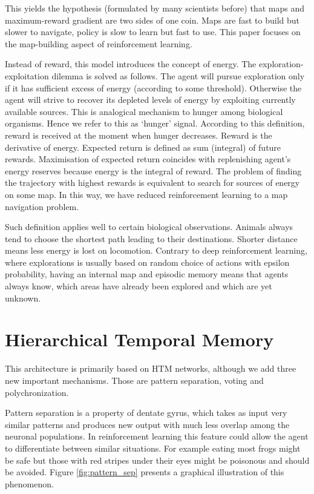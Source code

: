\documentclass[12pt]{article}
\begin{document}
This yields the hypothesis (formulated by many scientists before) that maps and maximum-reward gradient are two sides of one coin. Maps are fast to build but slower to navigate, policy is slow to learn but fast to use. This paper focuses on the map-building aspect of reinforcement learning. 

Instead of reward, this model introduces the concept of energy. 
The exploration-exploitation dilemma is solved as follows. The agent will
pursue exploration only if it has sufficient excess of energy (according to some threshold). Otherwise the agent will strive to recover its depleted levels of energy by exploiting currently available sources. This is analogical mechanism to hunger among biological organisms. Hence we refer to this as `hunger' signal. According to this definition, reward is received at the moment when hunger decreases. Reward is the derivative of energy. Expected return is defined as sum (integral) of future rewards. Maximisation of expected return coincides with replenishing agent's energy reserves because energy is the integral of reward.  The problem of finding the trajectory with highest rewards is equivalent to search for sources of energy on some map. In this way, we have reduced reinforcement learning to a map navigation problem.

Such definition applies well to certain biological observations. Animals always tend to choose the shortest path leading to their destinations. Shorter distance means less energy is lost on locomotion. Contrary to deep reinforcement learning, where explorations is usually based on random choice of actions with epsilon probability, having an internal map and episodic memory means that agents always know, which areas have already been explored and which are yet unknown.  


\section{Hierarchical Temporal Memory} 

This architecture is primarily based on HTM\cite{bami} networks, although we add three new important mechanisms. Those are pattern separation, voting and polychronization. 

Pattern separation is a property of dentate gyrus, which takes as input very similar patterns and produces new output with much less overlap among the neuronal populations. In reinforcement learning this feature could allow the agent to differentiate between similar situations. For example eating most frogs might be safe but those with red stripes under their eyes might be poisonous and should be avoided. Figure \ref{fig:pattern_sep} presents a graphical illustration of this phenomenon. 
\end{document}
